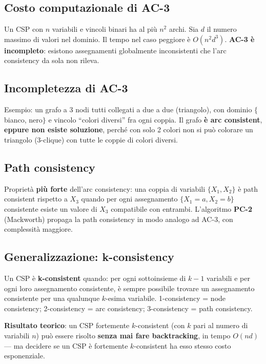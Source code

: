 \documentclass[11pt,a4paper]{report}
\begin{document}
\subsection*{Costo computazionale di AC-3}

Un CSP con $n$ variabili e vincoli binari ha al più $n^2$ archi. Sia $d$ il numero massimo di valori nel dominio. Il tempo nel caso peggiore è $O(n^2d^3)$. \textbf{AC-3 è incompleto}: esistono assegnamenti globalmente inconsistenti che l'arc consistency da sola non rileva.

\subsection*{Incompletezza di AC-3}

Esempio: un grafo a 3 nodi tutti collegati a due a due (triangolo), con dominio $\{$bianco, nero$\}$ e vincolo ``colori diversi'' fra ogni coppia. Il grafo \textbf{è arc consistent}, \textbf{eppure non esiste soluzione}, perché con solo 2 colori non si può colorare un triangolo (3-clique) con tutte le coppie di colori diversi.

\subsection*{Path consistency}

Proprietà \textbf{più forte} dell'arc consistency: una coppia di variabili $\{X_1,X_2\}$ è path consistent rispetto a $X_3$ quando per ogni assegnamento $\{X_1{=}a,X_2{=}b\}$ consistente esiste un valore di $X_3$ compatibile con entrambi. L'algoritmo \textbf{PC-2} (Mackworth) propaga la path consistency in modo analogo ad AC-3, con complessità maggiore.

\subsection*{Generalizzazione: k-consistency}

Un CSP è \textbf{k-consistent} quando: per ogni sottoinsieme di $k-1$ variabili e per ogni loro assegnamento consistente, è sempre possibile trovare un assegnamento consistente per una qualunque $k$-esima variabile. 1-consistency = node consistency; 2-consistency = arc consistency; 3-consistency = path consistency.

\textbf{Risultato teorico}: un CSP fortemente $k$-consistent (con $k$ pari al numero di variabili $n$) può essere risolto \textbf{senza mai fare backtracking}, in tempo $O(nd)$ --- ma decidere se un CSP è fortemente $k$-consistent ha esso stesso costo esponenziale.
\end{document}
